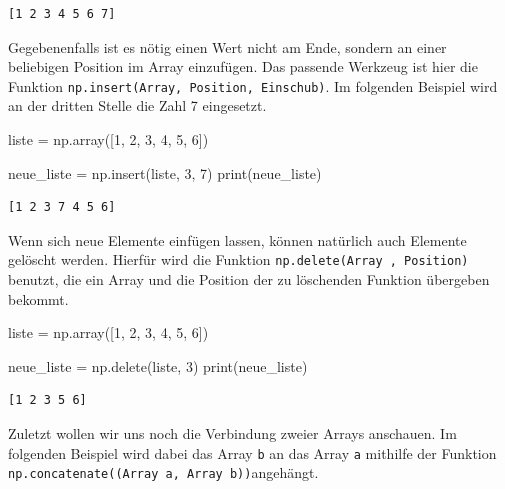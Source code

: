\documentclass[
  letterpaper,
  DIV=11,
  numbers=noendperiod]{scrreprt}
\newenvironment{Shaded}{\begin{snugshade}}{\end{snugshade}}
\newcommand{\BuiltInTok}[1]{\textcolor[rgb]{0.00,0.23,0.31}{#1}}
\newcommand{\DecValTok}[1]{\textcolor[rgb]{0.68,0.00,0.00}{#1}}
\newcommand{\NormalTok}[1]{\textcolor[rgb]{0.00,0.23,0.31}{#1}}
\newcommand{\OperatorTok}[1]{\textcolor[rgb]{0.37,0.37,0.37}{#1}}
\begin{document}
\begin{verbatim}
[1 2 3 4 5 6 7]
\end{verbatim}

Gegebenenfalls ist es nötig einen Wert nicht am Ende, sondern an einer
beliebigen Position im Array einzufügen. Das passende Werkzeug ist hier
die Funktion \texttt{np.insert(Array,\ Position,\ Einschub)}. Im
folgenden Beispiel wird an der dritten Stelle die Zahl 7 eingesetzt.

\begin{Shaded}
\begin{Highlighting}[]
\NormalTok{liste }\OperatorTok{=}\NormalTok{ np.array([}\DecValTok{1}\NormalTok{, }\DecValTok{2}\NormalTok{, }\DecValTok{3}\NormalTok{, }\DecValTok{4}\NormalTok{, }\DecValTok{5}\NormalTok{, }\DecValTok{6}\NormalTok{])}

\NormalTok{neue\_liste }\OperatorTok{=}\NormalTok{ np.insert(liste, }\DecValTok{3}\NormalTok{, }\DecValTok{7}\NormalTok{)}
\BuiltInTok{print}\NormalTok{(neue\_liste)}
\end{Highlighting}
\end{Shaded}

\begin{verbatim}
[1 2 3 7 4 5 6]
\end{verbatim}

Wenn sich neue Elemente einfügen lassen, können natürlich auch Elemente
gelöscht werden. Hierfür wird die Funktion
\texttt{np.delete(Array\ ,\ Position)} benutzt, die ein Array und die
Position der zu löschenden Funktion übergeben bekommt.

\begin{Shaded}
\begin{Highlighting}[]
\NormalTok{liste }\OperatorTok{=}\NormalTok{ np.array([}\DecValTok{1}\NormalTok{, }\DecValTok{2}\NormalTok{, }\DecValTok{3}\NormalTok{, }\DecValTok{4}\NormalTok{, }\DecValTok{5}\NormalTok{, }\DecValTok{6}\NormalTok{])}

\NormalTok{neue\_liste }\OperatorTok{=}\NormalTok{ np.delete(liste, }\DecValTok{3}\NormalTok{)}
\BuiltInTok{print}\NormalTok{(neue\_liste)}
\end{Highlighting}
\end{Shaded}

\begin{verbatim}
[1 2 3 5 6]
\end{verbatim}

Zuletzt wollen wir uns noch die Verbindung zweier Arrays anschauen. Im
folgenden Beispiel wird dabei das Array \texttt{b} an das Array
\texttt{a} mithilfe der Funktion
\texttt{np.concatenate((Array\ a,\ Array\ b))}angehängt.
\end{document}
